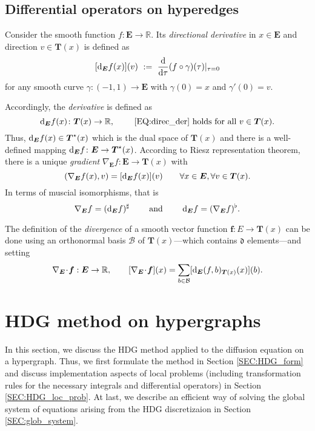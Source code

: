 \documentclass[a4paper, english, 12pt, reqno, draft]{amsart}
\theoremstyle{definition}
\theoremstyle{remark}
\numberwithin{equation}{section}
\newcommand{\Edge}{{\ensuremath{\boldsymbol E}}}
\newcommand{\locDim}{\ensuremath{\mathfrak d}}
\newcommand{\Der}{\ensuremath{\textup d_\Edge}}
\newcommand{\Nabla}{\ensuremath{\nabla_\Edge}}
\newcommand{\Div}{\ensuremath{\Nabla\!\cdot\!}}
\newcommand{\tangent}{\ensuremath{{\boldsymbol T}}}
\newcommand{\basis}{\ensuremath{\mathcal B}}
\newcommand{\IR}{\ensuremath{\mathbb R}}
\renewcommand{\vec}[1]{\ensuremath{\boldsymbol{#1}}}
\begin{document}
\subsection{Differential operators on hyperedges}\label{SEC:diff_op}
% 
Consider the smooth function $f: \Edge \to \IR$. Its \emph{directional derivative} in $x \in \Edge$ and direction $v \in \tangent(x)$ is defined as
% 
\begin{equation}\label{EQ:direc_der}
 [\Der f(x)](v) ~:=~ \frac{\textup d}{\textup d \tau} (f \circ \gamma)(\tau)|_{\tau = 0}
\end{equation}
% 
for any smooth curve $\gamma: (-1,1) \to \Edge$ with $\gamma(0) = x$ and $\gamma'(0) = v$.

Accordingly, the \emph{derivative} is defined as
% 
\begin{equation*}
 \Der f(x) \colon \tangent(x) \to \IR, \qquad \text{ \eqref{EQ:direc_der} holds for all $v \in \tangent(x)$.}
\end{equation*}
% 
Thus, $\Der f(x) \in \tangent^\star(x)$ which is the dual space of $\tangent (x)$ and there is a well-defined mapping $\Der f \colon \Edge \to \tangent^\star(x)$. According to Riesz representation theorem, there is a unique \emph{gradient} $\Nabla f \colon \Edge \to \tangent(x)$ with
% 
\begin{equation*}
 (\Nabla f(x), v) = [\Der f(x)](v) \qquad \forall x \in \Edge, \forall v \in \tangent(x).
\end{equation*}
% 
In terms of muscial isomorphisms, that is
% 
\begin{equation*}
 \Nabla f = (\Der f)^\sharp \qquad \text{ and } \qquad \Der f = (\Nabla f)^\flat.
\end{equation*}

The definition of the \emph{divergence} of a smooth vector function $\vec f \colon E \to \tangent(x)$ can be done using an orthonormal basis $\basis$ of $\tangent(x)$---which contains $\locDim$ elements---and setting
% 
\begin{equation*}
 \Div \vec f: \Edge \to \IR, \qquad [\Div \vec f](x) = \sum_{b \in \basis} [\Der (f, b)_{\tangent(x)} (x)](b).
\end{equation*}
% 
\section{HDG method on hypergraphs}
%
In this section, we discuss the HDG method applied to the diffusion equation on a hypergraph. Thus, we first formulate the method in Section \ref{SEC:HDG_form} and discuss implementation aspects of local problems (including transformation rules for the necessary integrals and differential operators) in Section \ref{SEC:HDG_loc_prob}. At last, we describe an efficient way of solving the global system of equations arising from the HDG discretizaion in Section \ref{SEC:glob_system}.
% 
\end{document}
